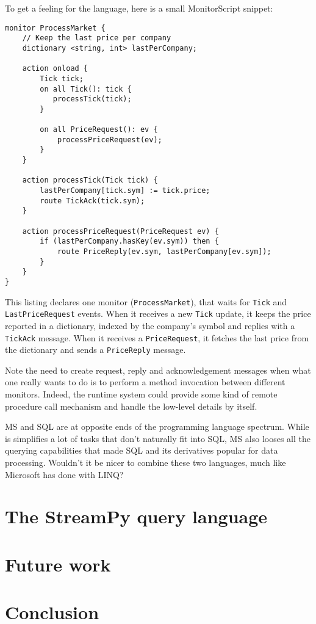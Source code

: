 \documentclass{report}
\begin{document}
To get a feeling for the language, here is a small MonitorScript snippet:

\begin{verbatim}
monitor ProcessMarket {
    // Keep the last price per company
    dictionary <string, int> lastPerCompany;

    action onload {
        Tick tick;
        on all Tick(): tick {
           processTick(tick);
        }

        on all PriceRequest(): ev {
            processPriceRequest(ev);
        }
    }

    action processTick(Tick tick) {
        lastPerCompany[tick.sym] := tick.price;
        route TickAck(tick.sym);
    }

    action processPriceRequest(PriceRequest ev) {
        if (lastPerCompany.hasKey(ev.sym)) then {
            route PriceReply(ev.sym, lastPerCompany[ev.sym]);
        }
    }
}
\end{verbatim}

This listing declares one monitor (\verb=ProcessMarket=), that waits for \verb=Tick= and \verb=LastPriceRequest= events. When it receives a new \verb=Tick= update, it keeps the price reported in a dictionary, indexed by the company's symbol and replies with a \verb=TickAck= message. When it receives a \verb=PriceRequest=, it fetches the last price from the dictionary and sends a \verb=PriceReply= message.

Note the need to create request, reply and acknowledgement messages when what one really wants to do is to perform a method invocation between different monitors. Indeed, the runtime system could provide some kind of remote procedure call mechanism and handle the low-level details by itself.

MS and SQL are at opposite ends of the programming language spectrum. While is simplifies a lot of tasks that don't naturally fit into SQL, MS also looses all the querying capabilities that made SQL and its derivatives popular for data processing. Wouldn't it be nicer to combine these two languages, much like Microsoft has done with LINQ?

\chapter{The StreamPy query language}\label{streampy}

\chapter{Future work}\label{future-work}

\chapter{Conclusion}\label{conclusion}
\end{document}
